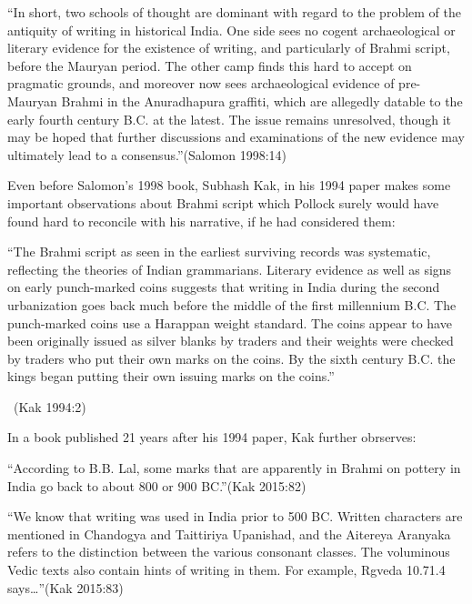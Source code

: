 \begin{myquote}
“In short, two schools of thought are dominant with regard to the problem of the antiquity of writing in historical India. One side sees no cogent archaeological or literary evidence for the existence of writing, and particularly of Brahmi script, before the Mauryan period. The other camp finds this hard to accept on pragmatic grounds, and moreover now sees archaeological evidence of pre-Mauryan Brahmi in the Anuradhapura graffiti, which are allegedly datable to the early fourth century B.C. at the latest. The issue remains unresolved, though it may be hoped that further discussions and examinations of the new evidence may ultimately lead to a consensus.”\hfill (Salomon 1998:14)
\end{myquote}

Even before Salomon’s 1998 book, Subhash Kak, in his 1994 paper makes some important observations about Brahmi script which Pollock surely would have found hard to reconcile with his narrative, if he had considered them:

\begin{myquote}
“The Brahmi script as seen in the earliest surviving records was systematic, reflecting the theories of Indian grammarians. Literary evidence as well as signs on early punch-marked coins suggests that writing in India during the second urbanization goes back much before the middle of the first millennium B.C. The punch-marked coins use a Harappan weight standard. The coins appear to have been originally issued as silver blanks by traders and their weights were checked by traders who put their own marks on the coins. By the sixth century B.C. the kings began putting their own issuing marks on the coins.”

~\hfill (Kak 1994:2)
\end{myquote}

In a book published 21 years after his 1994 paper, Kak further obrserves:

\begin{myquote}
“According to B.B. Lal, some marks that are apparently in Brahmi on pottery in India go back to about 800 or 900 BC.”\hfill (Kak 2015:82)
\end{myquote}

\begin{myquote}
“We know that writing was used in India prior to 500 BC. Written characters are mentioned in Chandogya and Taittiriya Upanishad, and the Aitereya Aranyaka refers to the distinction between the various consonant classes. The voluminous Vedic texts also contain hints of writing in them. For example, Rgveda 10.71.4 says…”\hfill (Kak 2015:83)
\end{myquote}

